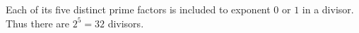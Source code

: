 Each of its five distinct prime factors is included to exponent $0$ or $1$ in a divisor. Thus there are $2^5=\boxed{32}$ divisors.
